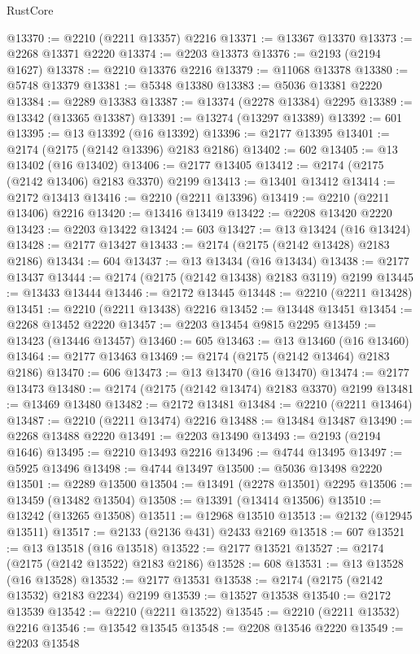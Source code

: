 \begin{lexlean}{RustCore}
\begin{coremodule}
@13370 := @2210 (@2211 @13357) @2216
@13371 := @13367 @13370
@13373 := @2268 @13371 @2220
@13374 := @2203 @13373
@13376 := @2193 (@2194 @1627)
@13378 := @2210 @13376 @2216
@13379 := @11068 @13378
@13380 := @5748 @13379
@13381 := @5348 @13380
@13383 := @5036 @13381 @2220
@13384 := @2289 @13383
@13387 := @13374 (@2278 @13384) @2295
@13389 := @13342 (@13365 @13387)
@13391 := @13274 (@13297 @13389)
@13392 := 601
@13395 := @13 @13392 (@16 @13392)
@13396 := @2177 @13395
@13401 := @2174 (@2175 (@2142 @13396) @2183 @2186)
@13402 := 602
@13405 := @13 @13402 (@16 @13402)
@13406 := @2177 @13405
@13412 := @2174 (@2175 (@2142 @13406) @2183 @3370) @2199
@13413 := @13401 @13412
@13414 := @2172 @13413
@13416 := @2210 (@2211 @13396)
@13419 := @2210 (@2211 @13406) @2216
@13420 := @13416 @13419
@13422 := @2208 @13420 @2220
@13423 := @2203 @13422
@13424 := 603
@13427 := @13 @13424 (@16 @13424)
@13428 := @2177 @13427
@13433 := @2174 (@2175 (@2142 @13428) @2183 @2186)
@13434 := 604
@13437 := @13 @13434 (@16 @13434)
@13438 := @2177 @13437
@13444 := @2174 (@2175 (@2142 @13438) @2183 @3119) @2199
@13445 := @13433 @13444
@13446 := @2172 @13445
@13448 := @2210 (@2211 @13428)
@13451 := @2210 (@2211 @13438) @2216
@13452 := @13448 @13451
@13454 := @2268 @13452 @2220
@13457 := @2203 @13454 @9815 @2295
@13459 := @13423 (@13446 @13457)
@13460 := 605
@13463 := @13 @13460 (@16 @13460)
@13464 := @2177 @13463
@13469 := @2174 (@2175 (@2142 @13464) @2183 @2186)
@13470 := 606
@13473 := @13 @13470 (@16 @13470)
@13474 := @2177 @13473
@13480 := @2174 (@2175 (@2142 @13474) @2183 @3370) @2199
@13481 := @13469 @13480
@13482 := @2172 @13481
@13484 := @2210 (@2211 @13464)
@13487 := @2210 (@2211 @13474) @2216
@13488 := @13484 @13487
@13490 := @2268 @13488 @2220
@13491 := @2203 @13490
@13493 := @2193 (@2194 @1646)
@13495 := @2210 @13493 @2216
@13496 := @4744 @13495
@13497 := @5925 @13496
@13498 := @4744 @13497
@13500 := @5036 @13498 @2220
@13501 := @2289 @13500
@13504 := @13491 (@2278 @13501) @2295
@13506 := @13459 (@13482 @13504)
@13508 := @13391 (@13414 @13506)
@13510 := @13242 (@13265 @13508)
@13511 := @12968 @13510
@13513 := @2132 (@12945 @13511)
@13517 := @2133 (@2136 @431) @2433 @2169
@13518 := 607
@13521 := @13 @13518 (@16 @13518)
@13522 := @2177 @13521
@13527 := @2174 (@2175 (@2142 @13522) @2183 @2186)
@13528 := 608
@13531 := @13 @13528 (@16 @13528)
@13532 := @2177 @13531
@13538 := @2174 (@2175 (@2142 @13532) @2183 @2234) @2199
@13539 := @13527 @13538
@13540 := @2172 @13539
@13542 := @2210 (@2211 @13522)
@13545 := @2210 (@2211 @13532) @2216
@13546 := @13542 @13545
@13548 := @2208 @13546 @2220
@13549 := @2203 @13548

\end{coremodule}
\end{lexlean}
